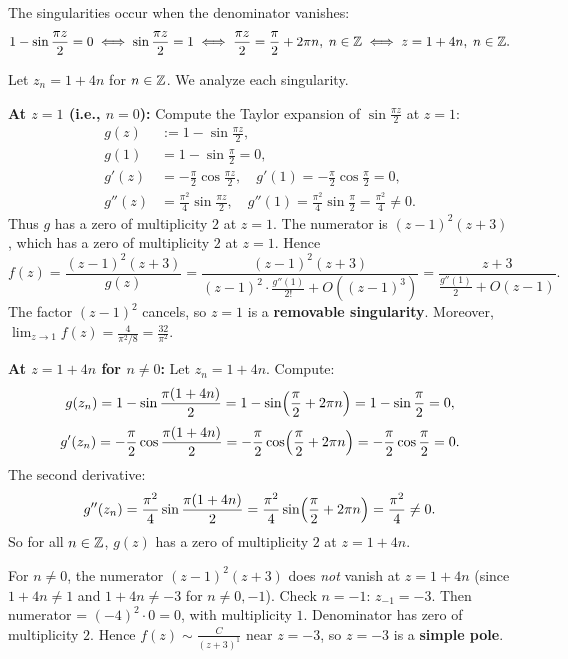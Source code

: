 \documentclass{article}
\begin{document}
\begin{solution}
  The singularities occur when the denominator vanishes:
  \[
    1 - \sin\frac{\pi z}{2} = 0 \iff \sin\frac{\pi z}{2} = 1
    \iff \frac{\pi z}{2} = \frac{\pi}{2} + 2\pi n,\; n \in \mathbb{Z}
    \iff z = 1 + 4n,\; n \in \mathbb{Z}.
  \]

  Let $z_n = 1 + 4n$ for $n \in \mathbb{Z}$. We analyze each singularity.

  \medskip
  \noindent\textbf{At $z = 1$ (i.e., $n = 0$):}
  Compute the Taylor expansion of $\sin\frac{\pi z}{2}$ at $z = 1$:
  \begin{align*}
    g(z) &:= 1 - \sin\frac{\pi z}{2}, \\
    g(1) &= 1 - \sin\frac{\pi}{2} = 0,\\
    g'(z) &= -\frac{\pi}{2} \cos\frac{\pi z}{2}, \quad
    g'(1) = -\frac{\pi}{2} \cos\frac{\pi}{2} = 0,\\
    g''(z) &= \frac{\pi^2}{4} \sin\frac{\pi z}{2}, \quad
    g''(1) = \frac{\pi^2}{4} \sin\frac{\pi}{2} = \frac{\pi^2}{4} \ne 0.
  \end{align*}
  Thus $g$ has a zero of multiplicity $2$ at $z = 1$. The numerator is
  $(z-1)^2(z+3)$, which has a zero of multiplicity $2$ at $z = 1$. Hence
  \[
    f(z) = \frac{(z-1)^2(z+3)}{g(z)} =
    \frac{(z-1)^2(z+3)}{(z-1)^2 \cdot \frac{g''(1)}{2!} + O((z-1)^3)}
    = \frac{z+3}{\frac{g''(1)}{2} + O(z-1)}.
  \]
  The factor $(z-1)^2$ cancels, so $z = 1$ is a \textbf{removable singularity}.
  Moreover, $\lim_{z \to 1} f(z) = \frac{4}{\pi^2/8} = \frac{32}{\pi^2}$.

  \medskip
  \noindent\textbf{At $z = 1 + 4n$ for $n \ne 0$:}
  Let $z_n = 1 + 4n$. Compute:
  \[
    g(z_n) = 1 - \sin\frac{\pi(1+4n)}{2} = 1 - \sin\Bigl(\frac{\pi}{2} + 2\pi n\Bigr)
    = 1 - \sin\frac{\pi}{2} = 0,
  \]
  \[
    g'(z_n) = -\frac{\pi}{2} \cos\frac{\pi(1+4n)}{2}
    = -\frac{\pi}{2} \cos\Bigl(\frac{\pi}{2} + 2\pi n\Bigr)
    = -\frac{\pi}{2} \cos\frac{\pi}{2} = 0.
  \]
  The second derivative:
  \[
    g''(z_n) = \frac{\pi^2}{4} \sin\frac{\pi(1+4n)}{2}
    = \frac{\pi^2}{4} \sin\Bigl(\frac{\pi}{2} + 2\pi n\Bigr)
    = \frac{\pi^2}{4} \ne 0.
  \]
  So for all $n \in \mathbb{Z}$, $g(z)$ has a zero of multiplicity $2$ at $z = 1+4n$.

  For $n \ne 0$, the numerator $(z-1)^2(z+3)$ does \emph{not} vanish at
  $z = 1+4n$ (since $1+4n \ne 1$ and $1+4n \ne -3$ for $n \ne 0, -1$).
  Check $n = -1$: $z_{-1} = -3$. Then numerator = $(-4)^2 \cdot 0 = 0$,
  with multiplicity $1$. Denominator has zero of multiplicity $2$. Hence
  $f(z) \sim \frac{C}{(z+3)^1}$ near $z = -3$, so $z = -3$ is a
  \textbf{simple pole}.


\end{solution}
\end{document}

